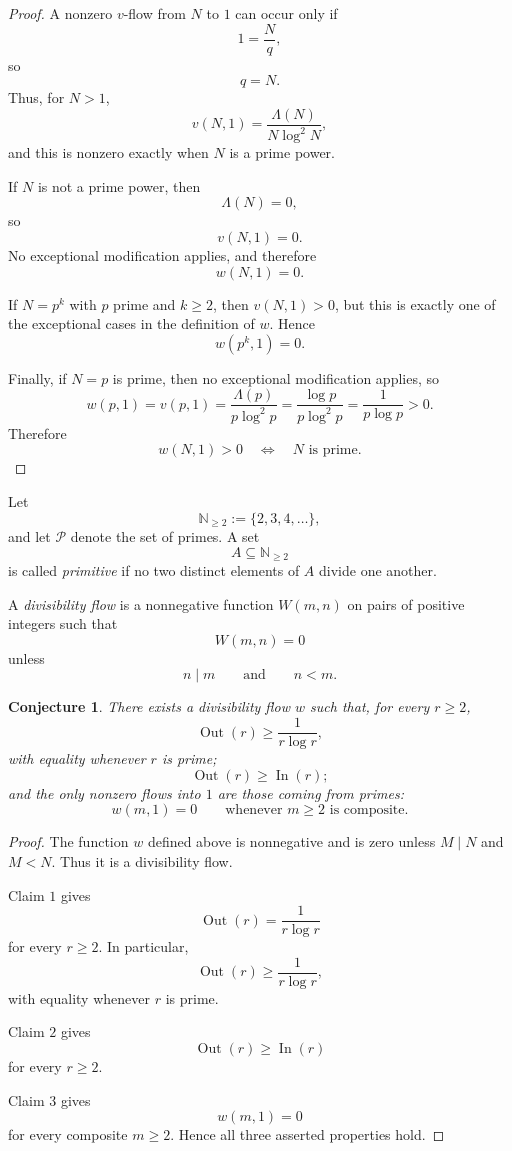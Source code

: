 \documentclass{amsart}
\newtheorem{conjecture}{Conjecture}
\newcommand{\N}{\mathbb N}
\newcommand{\Pp}{\mathcal P}
\begin{document}
\begin{proof}
A nonzero \(v\)-flow from \(N\) to \(1\) can occur only if
\[
1=\frac{N}{q},
\]
so
\[
q=N.
\]
Thus, for \(N>1\),
\[
v(N,1)=\frac{\Lambda(N)}{N\log^2 N},
\]
and this is nonzero exactly when \(N\) is a prime power.

If \(N\) is not a prime power, then
\[
\Lambda(N)=0,
\]
so
\[
v(N,1)=0.
\]
No exceptional modification applies, and therefore
\[
w(N,1)=0.
\]

If \(N=p^k\) with \(p\) prime and \(k\geq 2\), then \(v(N,1)>0\), but this is exactly one of the exceptional cases in the definition of \(w\).  Hence
\[
w(p^k,1)=0.
\]

Finally, if \(N=p\) is prime, then no exceptional modification applies, so
\[
w(p,1)=v(p,1)
=
\frac{\Lambda(p)}{p\log^2 p}
=
\frac{\log p}{p\log^2 p}
=
\frac{1}{p\log p}
>
0.
\]
Therefore
\[
w(N,1)>0
\quad\Longleftrightarrow\quad
N \text{ is prime}.
\]
\end{proof}

Let
\[
\N_{\geq 2}:=\{2,3,4,\dots\},
\]
and let \(\Pp\) denote the set of primes.  A set
\[
A\subseteq \N_{\geq 2}
\]
is called \emph{primitive} if no two distinct elements of \(A\) divide one another.

A \emph{divisibility flow} is a nonnegative function \(W(m,n)\) on pairs of positive integers such that
\[
W(m,n)=0
\]
unless
\[
n\mid m
\qquad\text{and}\qquad
n<m.
\]

\begin{conjecture}\label{conj:flow}
There exists a divisibility flow \(w\) such that, for every \(r\geq 2\),
\[
\operatorname{Out}(r)\geq \frac{1}{r\log r},
\]
with equality whenever \(r\) is prime;
\[
\operatorname{Out}(r)\geq \operatorname{In}(r);
\]
and the only nonzero flows into \(1\) are those coming from primes:
\[
w(m,1)=0
\qquad
\text{whenever } m\geq 2 \text{ is composite}.
\]
\end{conjecture}

\begin{proof}
The function \(w\) defined above is nonnegative and is zero unless \(M\mid N\) and \(M<N\).  Thus it is a divisibility flow.

Claim \(1\) gives
\[
\operatorname{Out}(r)=\frac{1}{r\log r}
\]
for every \(r\geq 2\).  In particular,
\[
\operatorname{Out}(r)\geq \frac{1}{r\log r},
\]
with equality whenever \(r\) is prime.

Claim \(2\) gives
\[
\operatorname{Out}(r)\geq \operatorname{In}(r)
\]
for every \(r\geq 2\).

Claim \(3\) gives
\[
w(m,1)=0
\]
for every composite \(m\geq 2\).  Hence all three asserted properties hold.
\end{proof}
\end{document}

